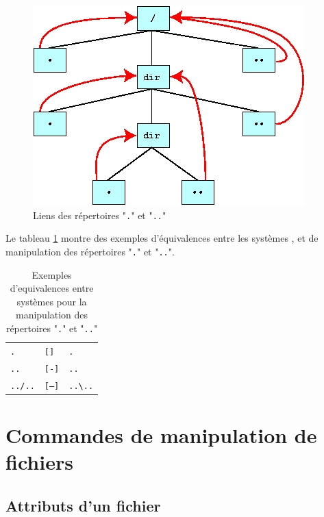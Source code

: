 \begin{figure}[hbtp]
\centering
\includegraphics{./_Images/cmds-unix/dotdirs.jpg}
\caption{\label{fig-cmds-dotdirs}Liens des r{\'e}pertoires "{\tt .}" et
"{\tt ..}"}
\end{figure}

Le tableau \ref{tab-cmds-dotdirs} montre des exemples d'{\'e}quivalences
entre les syst{\`e}mes {\Unix}, {\OpenVMS} et {\DOS} de manipulation des
r{\'e}pertoires "{\tt .}" et "{\tt ..}".

\begin{table}[hbtp]
\centering
\begin{tabular}{|l|l|l|}
	\hline
	{\Unix}		&	{\OpenVMS}	&	{\DOS}	\\
	\hline \hline
	{\tt .}		&	{\tt []}	&	{\tt .}			\\
	{\tt ..}	&	{\tt [-]}	&	{\tt ..}		\\
	{\tt ../..}	&	{\tt [--]}	&	\verb=..\..=	\\
	\hline
\end{tabular}
\caption{\label{tab-cmds-dotdirs}Exemples d'equivalences entre syst{\`e}mes pour
la manipulation des r{\'e}pertoires "{\tt .}" et "{\tt ..}"}
\end{table}
	
\section{Commandes de manipulation de fichiers}

\subsection{Attributs d'un fichier}

